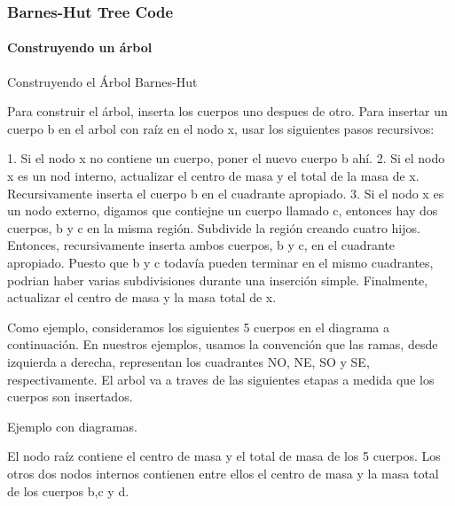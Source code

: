 \frame
{
\frametitle{Barnes-Hut Tree Code}
\framesubtitle{Construyendo un árbol}

Construyendo el Árbol Barnes-Hut

Para construir el árbol, inserta los cuerpos uno despues de otro.
Para insertar un cuerpo b en el arbol con raíz en el nodo x,
usar los siguientes pasos recursivos:

1. Si el nodo x no contiene un cuerpo, poner el nuevo cuerpo b ahí.
2. Si el nodo x es un nod interno, actualizar el centro de masa
   y el total de la masa de x. Recursivamente inserta el cuerpo b
   en el cuadrante apropiado.
3. Si el nodo x es un nodo externo, digamos que contiejne un cuerpo
   llamado c, entonces hay dos cuerpos, b y c en la misma región.
   Subdivide la región creando cuatro hijos. Entonces, recursivamente
   inserta ambos cuerpos, b y c, en el cuadrante apropiado. Puesto
   que b y c todavía pueden terminar en el mismo cuadrantes, podrian
   haber varias subdivisiones durante una inserción simple.
   Finalmente, actualizar el centro de masa y la masa total de x.

Como ejemplo, consideramos los siguientes 5 cuerpos en el diagrama
a continuación. En nuestros ejemplos, usamos la convención que las
ramas, desde izquierda a derecha, representan los cuadrantes
NO, NE, SO y SE, respectivamente.
El arbol va a traves de las siguientes etapas a medida que los
cuerpos son insertados.

Ejemplo con diagramas.

El nodo raíz contiene el centro de masa y el total 
de masa de los 5 cuerpos. Los otros dos nodos internos
contienen entre ellos el centro de masa y la masa total
de los cuerpos b,c y d.
}

